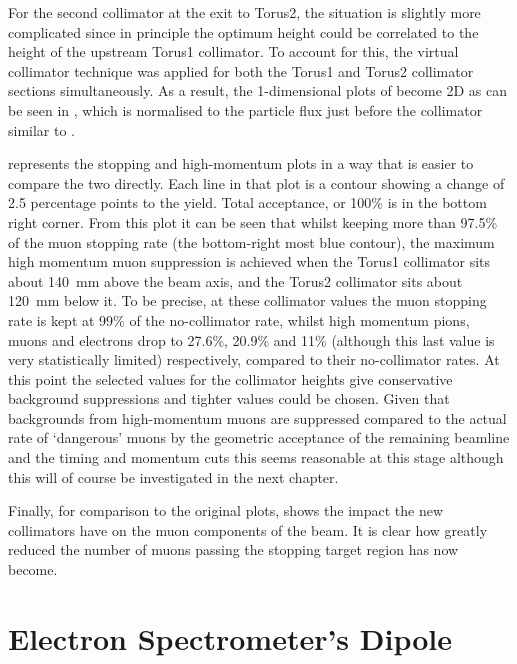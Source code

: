 For the second collimator at the exit to Torus2, the situation is slightly more complicated since in principle the optimum height could be correlated to the height of the upstream Torus1 collimator.
To account for this, the virtual collimator technique was applied for both the Torus1 and Torus2 collimator sections simultaneously.
As a result, the 1-dimensional plots of  become 2D as can be seen in 
, which is normalised to the particle flux just before the collimator similar to .

 represents the stopping and high-momentum plots in a way that is easier to compare the two directly.
Each line in that plot is a contour showing a change of 2.5 percentage points to the yield.  Total acceptance, or 100\% is in the bottom right corner.
From this plot it can be seen that whilst keeping more than 97.5\% of the muon stopping rate (the bottom-right most blue contour), the maximum high momentum muon suppression is achieved when the Torus1 collimator sits about 140~mm above the beam axis, and the Torus2 collimator sits about 120~mm below it.
To be precise, at these collimator values  the muon stopping rate is kept at 99\% of the no-collimator rate, whilst high momentum pions, muons and electrons drop to 27.6\%, 20.9\% and 11\% (although this last value is very statistically limited) respectively, compared to their no-collimator rates.
At this point the selected values for the collimator heights give conservative background suppressions and tighter values could be chosen.
Given that backgrounds from high-momentum muons are suppressed compared to the actual rate of `dangerous' muons by the geometric acceptance of the remaining beamline and the timing and momentum cuts this seems reasonable at this stage although this will of course be investigated in the next chapter.

Finally, for comparison to the original plots,  shows the impact the new collimators have on the muon components of the beam.
It is clear how greatly reduced the number of muons passing the stopping target region has now become.


\section{Electron Spectrometer's Dipole}


